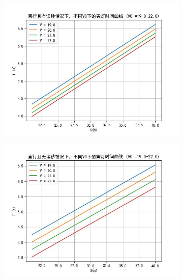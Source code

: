 \documentclass[withoutpreface,bwprint]{cumcmthesis}
\begin{document}
\begin{enumerate}
\begin{figure}[htbp!]
\begin{subfigure}[t]{0.45\textwidth}
			\label{fig:v02}
		\end{subfigure}
		\\
		\begin{subfigure}[t]{0.45\textwidth}
			\centering
			\includegraphics[width=\textwidth]{pics/Time_Curve_V0_WCT_STR22.0}
			\label{fig:v03}
		\end{subfigure}
		\hfill
		\begin{subfigure}[t]{0.45\textwidth}
			\centering
			\includegraphics[width=\textwidth]{pics/A} %
			\label{fig:v04}
		\end{subfigure}

\end{figure}
\end{enumerate}
\end{document}
